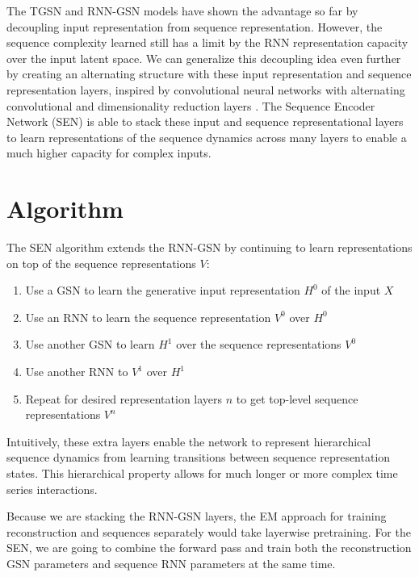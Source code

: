 The TGSN and RNN-GSN models have shown the advantage so far by decoupling input representation from sequence representation. However, the sequence complexity learned still has a limit by the RNN representation capacity over the input latent space. We can generalize this decoupling idea even further by creating an alternating structure with these input representation and sequence representation layers, inspired by convolutional neural networks with alternating convolutional and dimensionality reduction layers \cite{lenet5}. The Sequence Encoder Network (SEN) is able to stack these input and sequence representational layers to learn representations of the sequence dynamics across many layers to enable a much higher capacity for complex inputs.

\section{Algorithm}
The SEN algorithm extends the RNN-GSN by continuing to learn representations on top of the sequence representations \(V\): 
\begin{enumerate}
\item Use a GSN to learn the generative input representation \(H^0\) of the input \(X\)
\item Use an RNN to learn the sequence representation \(V^0\) over \(H^0\)
\item Use another GSN to learn \(H^1\) over the sequence representations \(V^0\)
\item Use another RNN to \(V^1\) over \(H^1\)
\item Repeat for desired representation layers \(n\) to get top-level sequence representations \(V^n\)
\end{enumerate}

Intuitively, these extra layers enable the network to represent hierarchical sequence dynamics from learning transitions between sequence representation states. This hierarchical property allows for much longer or more complex time series interactions.

Because we are stacking the RNN-GSN layers, the EM approach for training reconstruction and sequences separately would take layerwise pretraining. For the SEN, we are going to combine the forward pass and train both the reconstruction GSN parameters and sequence RNN parameters at the same time.

